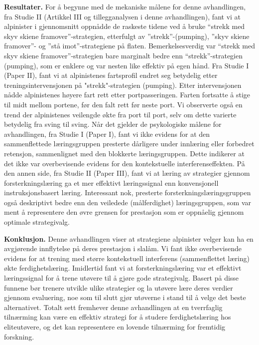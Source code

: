 \textbf{Resultater.} For å begynne med de mekaniske målene for denne avhandlingen, fra Studie II (Artikkel III og tillegganalysen i denne avhandlingen), fant vi at alpinister i gjennomsnitt oppnådde de raskeste tidene ved å bruke “strekk med skyv skiene framover”-strategien, etterfulgt av ”strekk”-(pumping), ”skyv skiene framover”- og ”stå imot”-strategiene på flaten. Bemerkelsesverdig var “strekk med skyv skiene framover”-strategien bare marginalt bedre enn “strekk”-strategien (pumping), som er enklere og var nesten like effektiv på egen hånd. Fra Studie I (Paper II), fant vi at alpinistenes fartsprofil endret seg betydelig etter treningsintervensjonen på "strekk"-strategien (pumping). Etter intervensjonen nådde alpinistenes høyere fart rett etter portpasseringen. Farten fortsatte å stige til midt mellom portene, før den falt rett før neste port. Vi observerte også en trend der alpinistenes veilengde økte fra port til port, selv om dette varierte betydelig fra sving til sving. Når det gjelder de psykologiske målene for avhandlingen, fra Studie I (Paper I), fant vi ikke evidens for at den sammenflettede læringsgruppen presterte dårligere under innlæring eller forbedret retensjon, sammenlignet med den blokkerte læringsgruppen. Dette indikerer at det ikke var overbevisende evidens for den kontekstuelle interferenseffekten. På den annen side, fra Studie II (Paper III), fant vi at læring av strategier gjennom forsterkningslæring ga et mer effektivt læringssignal enn konvensjonell instruksjonsbasert læring. Interessant nok, presterte forsterkningslæringsgruppen også deskriptivt bedre enn den veiledede (målferdighet) læringsgruppen, som var ment å representere den øvre grensen for prestasjon som er oppnåelig gjennom optimale strategivalg.

\textbf{Konklusjon. }Denne avhandlingen viser at strategiene alpinister velger kan ha en avgjørende innflytelse på deres prestasjon i slalåm. Vi fant ikke overbevisende evidens for at trening med større kontekstuell interferens (sammenflettet læring) økte ferdighetslæring. Imidlertid fant vi at forsterkningslæring var et effektivt læringssignal for å trene utøvere til å gjøre gode strategivalg. Basert på disse funnene bør trenere utvikle ulike strategier og la utøvere lære deres verdier gjennom evaluering, noe som til slutt gjør utøverne i stand til å velge det beste alternativet. Totalt sett fremhever denne avhandlingen at en tverrfaglig tilnærming kan være en effektiv strategi for å studere ferdighetslæring hos eliteutøvere, og det kan representere en lovende tilnærming for fremtidig forskning.


\setlength{\parindent}{15pt} %
\setlength{\parskip}{0pt}    %